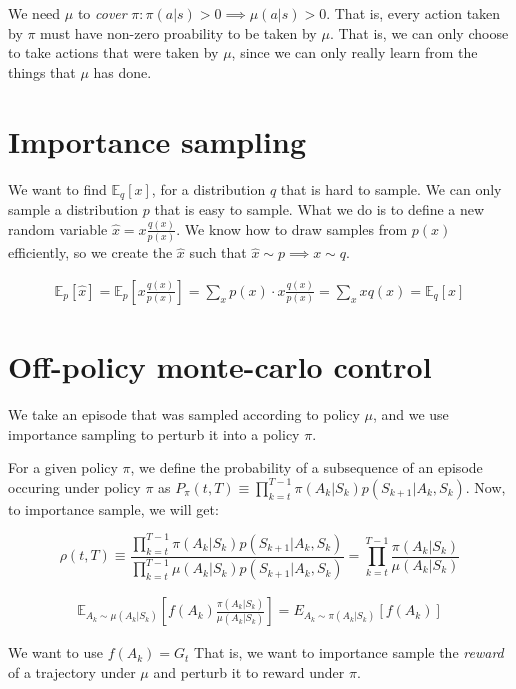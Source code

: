\documentclass[11pt]{book}
\newcommand{\E}{\mathbb{E}}
\begin{document}
We need $\mu$ to \emph{cover} $\pi: \pi(a|s) > 0 \implies \mu(a|s) > 0$. That is, every action
taken by $\pi$ must have non-zero proability to be taken by $\mu$. That is, we can
only choose to take actions that were taken by $\mu$, since we can only really learn from the
things that $\mu$ has done.

\section{Importance sampling}
We want to find $\E_q[x]$, for a distribution $q$ that is hard to sample. We can only sample a distribution $p$
that is easy to sample. What we do is to define a new random variable $\hat x = x \frac{q(x)}{p(x)}$. We know
how to draw samples from $p(x)$ efficiently, so we create the $\hat x$ such that $\hat x \sim p \implies x \sim q$.

\begin{align*}
\E_p[\hat x] = \E_p\left[x \frac{q(x)}{p(x)}\right] = \sum_x p(x) \cdot x \frac{q(x)}{p(x)} = \sum_x x q(x) = \E_q[x]
\end{align*}

\section{Off-policy monte-carlo control}

We take an episode that was sampled according to policy $\mu$, and we use importance sampling to perturb it into
a policy $\pi$.

For a given policy $\pi$, we define the probability of a subsequence of an episode occuring under policy $\pi$ as
$P_\pi(t, T) \equiv \prod_{k=t}^{T-1} \pi(A_k|S_k) p(S_{k+1}| A_k, S_k)$. Now, to importance sample, we will get:


$$
\rho(t, T) \equiv 
\frac{ \prod_{k=t}^{T-1} \pi(A_k|S_k) p(S_{k+1}| A_k, S_k)}{ \prod_{k=t}^{T-1} \mu(A_k|S_k) p(S_{k+1}| A_k, S_k)}
  = \prod_{k=t}^{T-1} \frac{\pi(A_k|S_k)}{\mu(A_k|S_k)} 
$$

\begin{align*}
\E_{A_k \sim \mu(A_k | S_k)}\left[ f(A_k) \frac{\pi(A_k|S_k)}{\mu(A_k|S_k)} \right] = E_{A_k \sim \pi(A_k|S_k)}[f(A_k)]
\end{align*}

We want to use $f(A_k) = G_t$ That is, we want to importance sample the \textit{reward} of a trajectory under $\mu$
and perturb it to reward under $\pi$.
\end{document}
